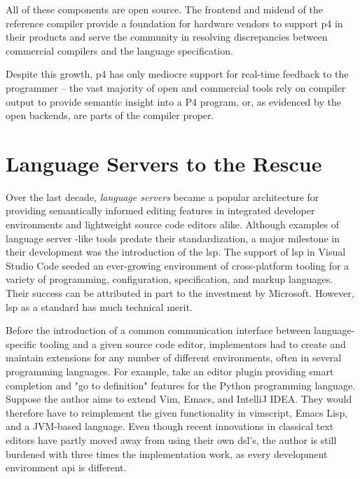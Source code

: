 All of these components are open source. The frontend and mid\-end of the
reference compiler provide a foundation for hardware vendors to support
\acrshort{p4} in their products and serve the community in resolving
discrepancies between commercial compilers and the language specification.

Despite this growth, \acrshort{p4} has only mediocre support for real-time
feedback to the programmer -- the vast majority of open and commercial tools
rely on compiler output to provide semantic insight into a P4
program\cite{p4insight}, or, as evidenced by the open backends, are parts of the
compiler proper.

\section*{Language Servers to the Rescue}

Over the last decade,
\emph{language servers} became a popular architecture\cite{barros2022editing}
for providing semantically informed editing features in integrated developer
environments and lightweight source code editors alike. Although examples of
language server -like tools predate their standardization\cite{bour2018merlin},
a major milestone in their development was the introduction of the
\acrfull{lsp}. The support of \acrshort{lsp} in Visual Studio Code seeded an
ever-growing environment of cross-platform tooling for a variety of programming,
configuration, specification, and markup languages. Their success can be
attributed in part to the investment by Microsoft. However, \acrshort{lsp} as a
standard has much technical merit.

Before the introduction of a common communication interface between
language-specific tooling and a given source code editor, implementors had to
create and maintain extensions for any number of different environments, often
in several programming languages. For example, take an editor plugin providing
smart completion and "go to definition" features for the Python programming
language. Suppose the author aims to extend Vim, Emacs, and IntelliJ IDEA. They
would therefore have to reimplement the given functionality in vimscript, Emacs
Lisp, and a JVM-based language. Even though recent innovations in classical text
editors have partly moved away from using their own
\acrshort{dsl}'s, the author is still burdened with three times the
implementation work, as every development environment \acrshort{api} is
different.

